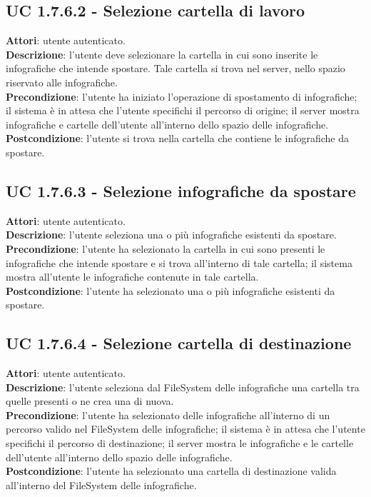 		\subsection{UC 1.7.6.2 - Selezione cartella di lavoro}{
			\label{uc1.7.6.2}
			\textbf{Attori}: utente autenticato. \\
			\textbf{Descrizione}: l'utente deve selezionare la cartella in cui sono inserite le infografiche che intende spostare. Tale cartella si trova nel server, nello spazio riservato alle infografiche. \\
			\textbf{Precondizione}: l'utente ha iniziato l'operazione di spostamento di infografiche; il sistema è in attesa che l'utente specifichi il percorso di origine; il server mostra infografiche e cartelle dell'utente all'interno dello spazio delle infografiche.	\\
			\textbf{Postcondizione}: l'utente si trova nella cartella che contiene le infografiche da spostare.	\\
			}
		\subsection{UC 1.7.6.3 - Selezione infografiche da spostare}{
			\label{uc1.7.6.3}
			\textbf{Attori}: utente autenticato. \\
			\textbf{Descrizione}: l'utente seleziona una o più infografiche esistenti da spostare. \\
			\textbf{Precondizione}: l'utente ha selezionato la cartella in cui sono presenti le infografiche che intende spostare e si trova all'interno di tale cartella; il sistema mostra all'utente le infografiche contenute in tale cartella.	\\
			\textbf{Postcondizione}: l'utente ha selezionato una o più infografiche esistenti da spostare.	\\
			}				
		\subsection{UC 1.7.6.4 - Selezione cartella di destinazione}{
			\label{uc1.7.6.4}
			\textbf{Attori}: utente autenticato. \\
			\textbf{Descrizione}: l'utente seleziona dal FileSystem delle infografiche una cartella tra quelle presenti o ne crea una di nuova. \\
			\textbf{Precondizione}: l'utente ha selezionato delle infografiche all'interno di un percorso valido nel FileSystem delle infografiche; il sistema è in attesa che l'utente specifichi il percorso di destinazione; il server mostra le infografiche e le cartelle dell'utente all'interno dello spazio delle infografiche.	\\
			\textbf{Postcondizione}: l'utente ha selezionato una cartella di destinazione valida all'interno del FileSystem delle infografiche.	\\
			}
